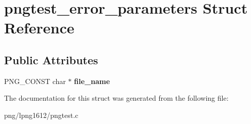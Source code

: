 \hypertarget{structpngtest__error__parameters}{\section{pngtest\+\_\+error\+\_\+parameters Struct Reference}
\label{structpngtest__error__parameters}
}
\subsection*{Public Attributes}
\begin{DoxyCompactItemize}
\item 
\hypertarget{structpngtest__error__parameters_a980b672c6fd4c419cd590c465a44b7aa}{P\+N\+G\+\_\+\+C\+O\+N\+S\+T char $\ast$ {\bfseries file\+\_\+name}}\label{structpngtest__error__parameters_a980b672c6fd4c419cd590c465a44b7aa}

\end{DoxyCompactItemize}


The documentation for this struct was generated from the following file\+:\begin{DoxyCompactItemize}
\item 
png/lpng1612/pngtest.\+c\end{DoxyCompactItemize}
